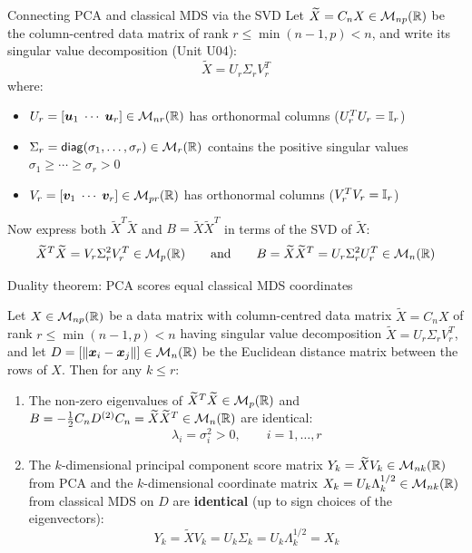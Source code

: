 \documentclass[aspectratio=169]{beamer}\usepackage[]{graphicx}\usepackage[]{xcolor}
\begin{document}
\begin{frame}{Connecting PCA and classical MDS via the SVD}
Let $\widetilde{X} = C_n X \in \mathcal{M}_{np}(\mathbb{R})$ be the column-centred data matrix of rank $r \le \min(n-1,p) < n$, and write its singular value decomposition (Unit U04):
\[
\widetilde{X} = U_r \Sigma_r V_r^T
\]
where:
\begin{itemize}
\item $U_r = [\bm{u}_1 \;\cdots\; \bm{u}_r]\in\mathcal{M}_{nr}(\mathbb{R})$ has orthonormal columns ($U_r^T U_r = \mathbb{I}_r$)
\item $\Sigma_r = \mathsf{diag}(\sigma_1,\ldots,\sigma_r)\in\mathcal{M}_r(\mathbb{R})$ contains the positive singular values $\sigma_1 \ge \cdots \ge \sigma_r > 0$
\item $V_r = [\bm{v}_1 \;\cdots\; \bm{v}_r]\in\mathcal{M}_{pr}(\mathbb{R})$ has orthonormal columns ($V_r^T V_r = \mathbb{I}_r$)
\end{itemize}
\vfill
Now express both $\widetilde{X}^T \widetilde{X}$ and $B = \widetilde{X} \widetilde{X}^T$ in terms of the SVD of $\widetilde{X}$:
\[
\widetilde{X}^T \widetilde{X} = V_r \Sigma_r^2 V_r^T \in \mathcal{M}_p(\mathbb{R})
\qquad\text{and}\qquad
B = \widetilde{X} \widetilde{X}^T = U_r \Sigma_r^2 U_r^T \in \mathcal{M}_n(\mathbb{R})
\]
\end{frame}

\begin{frame}{Duality theorem: PCA scores equal classical MDS coordinates}
\begin{theorem}
\label{th:pca_mds_duality}
Let $X\in\mathcal{M}_{np}(\mathbb{R})$ be a data matrix with column-centred data matrix $\widetilde{X} = C_n X$ of rank $r \le \min(n-1,p) < n$ having singular value decomposition $\widetilde{X} = U_r \Sigma_r V_r^T$, and let $D = [\|\bm{x}_i - \bm{x}_j\|]\in\mathcal{M}_n(\mathbb{R})$ be the Euclidean distance matrix between the rows of $X$. Then for any $k \le r$:
\begin{enumerate}
\item The non-zero eigenvalues of $\widetilde{X}^T \widetilde{X}\in\mathcal{M}_p(\mathbb{R})$ and $B = -\frac{1}{2}C_n D^{(2)} C_n = \widetilde{X} \widetilde{X}^T\in\mathcal{M}_n(\mathbb{R})$ are identical:
\[
\lambda_i = \sigma_i^2 > 0, \qquad i=1,\ldots,r
\]
\item The $k$-dimensional principal component score matrix $Y_k = \widetilde{X} V_k\in\mathcal{M}_{nk}(\mathbb{R})$ from PCA and the $k$-dimensional coordinate matrix $X_k = U_k \Lambda_k^{1/2}\in\mathcal{M}_{nk}(\mathbb{R})$ from classical MDS on $D$ are \textbf{identical} (up to sign choices of the eigenvectors):
\[
Y_k = \widetilde{X} V_k = U_k \Sigma_k = U_k \Lambda_k^{1/2} = X_k
\]
\end{enumerate}
\end{theorem}
\end{frame}
\end{document}
